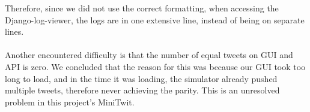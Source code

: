 Therefore, since we did not use the correct formatting, when accessing the Django-log-viewer, the logs are in one extensive line, instead of being on separate lines.
\\\\
Another encountered difficulty is that the number of equal tweets on GUI and API is zero. We concluded that the reason for this was because our GUI took too long to load, and in the time it was loading, the simulator already pushed multiple tweets, therefore never achieving the parity. This is an unresolved problem in this project's MiniTwit.